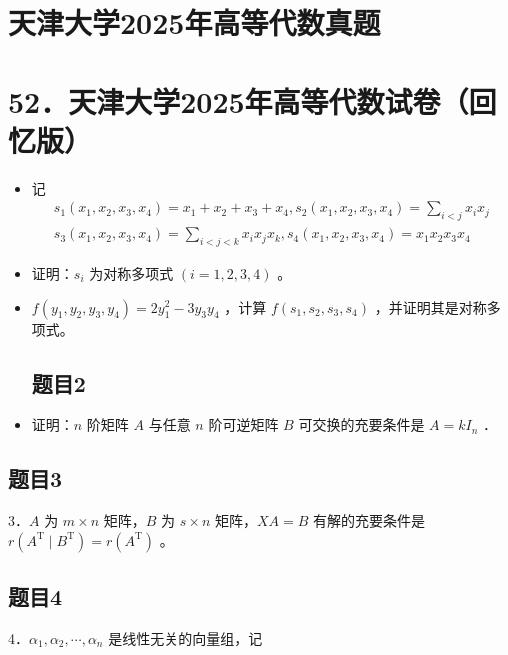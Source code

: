 \documentclass{article}
\begin{document}
\section*{天津大学2025年高等代数真题}
\section*{52．天津大学2025年高等代数试卷（回忆版）}
\begin{itemize}

\subsection{题目1}
  \item[1．] 记
\[
\begin{gathered}
s_{1}\left(x_{1}, x_{2}, x_{3}, x_{4}\right)=x_{1}+x_{2}+x_{3}+x_{4}, s_{2}\left(x_{1}, x_{2}, x_{3}, x_{4}\right)=\sum_{i<j} x_{i} x_{j} \\
s_{3}\left(x_{1}, x_{2}, x_{3}, x_{4}\right)=\sum_{i<j<k} x_{i} x_{j} x_{k}, s_{4}\left(x_{1}, x_{2}, x_{3}, x_{4}\right)=x_{1} x_{2} x_{3} x_{4}
\end{gathered}
\]
  \item[（1）] 证明：\(s_{i}\) 为对称多项式 \((i=1,2,3,4)\) 。
  \item[（2）] \(f\left(y_{1}, y_{2}, y_{3}, y_{4}\right)=2 y_{1}^{2}-3 y_{3} y_{4}\) ，计算 \(f\left(s_{1}, s_{2}, s_{3}, s_{4}\right)\) ，并证明其是对称多项式。

\subsection{题目2}
  \item[2．] 证明：\(n\) 阶矩阵 \(A\) 与任意 \(n\) 阶可逆矩阵 \(B\) 可交换的充要条件是 \(A=k I_{n}\) ．
\end{itemize}

\subsection{题目3}
3．\(A\) 为 \(m \times n\) 矩阵，\(B\) 为 \(s \times n\) 矩阵，\(X A=B\) 有解的充要条件是 \(r\left(A^{\mathrm{T}} \mid B^{\mathrm{T}}\right)=r\left(A^{\mathrm{T}}\right)\) 。

\subsection{题目4}
4．\(\alpha_{1}, \alpha_{2}, \cdots, \alpha_{n}\) 是线性无关的向量组，记
\end{document}
